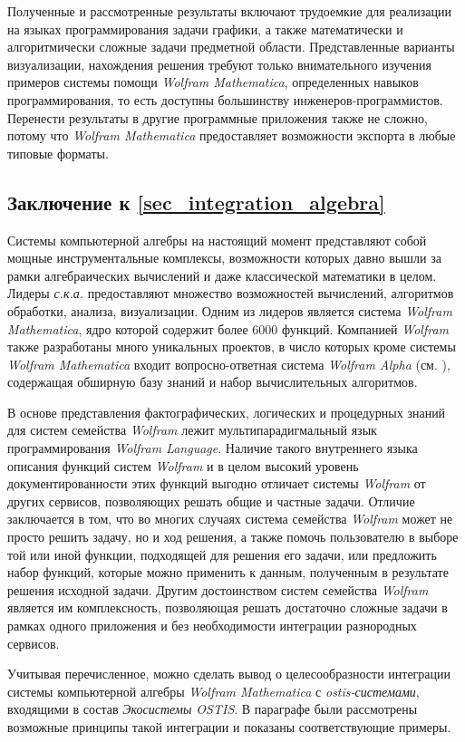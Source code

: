 Полученные и рассмотренные результаты включают трудоемкие для реализации на языках программирования задачи графики, а также математически и алгоритмически сложные задачи предметной области. Представленные варианты визуализации, нахождения решения требуют только внимательного изучения примеров системы помощи \textit{Wolfram Mathematica}, определенных навыков программирования, то есть доступны большинству инженеров-программистов. Перенести результаты в другие программные приложения также не сложно, потому что \textit{Wolfram Mathematica} предоставляет возможности экспорта в любые типовые форматы.

\subsection*{Заключение к \ref{sec_integration_algebra}}

Системы компьютерной алгебры на настоящий момент представляют собой мощные инструментальные комплексы, возможности которых давно вышли за рамки алгебраических вычислений и даже классической математики в целом. Лидеры \textit{с.к.а.} предоставляют множество возможностей вычислений, алгоритмов обработки, анализа, визуализации. Одним из лидеров является система \textit{Wolfram Mathematica}, ядро которой содержит более 6000 функций. Компанией \textit{Wolfram} также разработаны много уникальных проектов, в число которых кроме системы \textit{Wolfram Mathematica} входит вопросно-ответная система \textit{Wolfram Alpha} (см. ), содержащая обширную базу знаний и набор вычислительных алгоритмов. 

В основе представления фактографических, логических и процедурных знаний для систем семейства \textit{Wolfram} лежит мультипарадигмальный язык программирования \textit{Wolfram Language}. Наличие такого внутреннего языка описания функций систем \textit{Wolfram} и в целом высокий уровень документированности этих функций выгодно отличает системы \textit{Wolfram} от других сервисов, позволяющих решать общие и частные задачи. Отличие заключается в том, что во многих случаях система семейства \textit{Wolfram} может не просто решить задачу, но и  ход решения, а также помочь пользователю в выборе той или иной функции, подходящей для решения его задачи, или предложить набор функций, которые можно применить к данным, полученным в результате решения исходной задачи. Другим достоинством систем семейства \textit{Wolfram} является им комплексность, позволяющая решать достаточно сложные задачи в рамках одного приложения и без необходимости интеграции разнородных сервисов.

Учитывая перечисленное, можно сделать вывод о целесообразности интеграции системы компьютерной алгебры \textit{Wolfram Mathematica} с \textit{ostis-системами}, входящими в состав \textit{Экосистемы OSTIS}. В параграфе были рассмотрены возможные принципы такой интеграции и показаны соответствующие примеры.